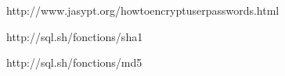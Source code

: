 http://www.jasypt.org/howtoencryptuserpasswords.html

http://sql.sh/fonctions/sha1

http://sql.sh/fonctions/md5